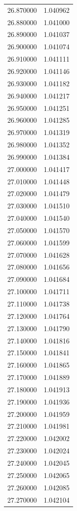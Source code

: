 \begin{tabular}{rr}
26.870000 & 1.040962 \\
26.880000 & 1.041000 \\
26.890000 & 1.041037 \\
26.900000 & 1.041074 \\
26.910000 & 1.041111 \\
26.920000 & 1.041146 \\
26.930000 & 1.041182 \\
26.940000 & 1.041217 \\
26.950000 & 1.041251 \\
26.960000 & 1.041285 \\
26.970000 & 1.041319 \\
26.980000 & 1.041352 \\
26.990000 & 1.041384 \\
27.000000 & 1.041417 \\
27.010000 & 1.041448 \\
27.020000 & 1.041479 \\
27.030000 & 1.041510 \\
27.040000 & 1.041540 \\
27.050000 & 1.041570 \\
27.060000 & 1.041599 \\
27.070000 & 1.041628 \\
27.080000 & 1.041656 \\
27.090000 & 1.041684 \\
27.100000 & 1.041711 \\
27.110000 & 1.041738 \\
27.120000 & 1.041764 \\
27.130000 & 1.041790 \\
27.140000 & 1.041816 \\
27.150000 & 1.041841 \\
27.160000 & 1.041865 \\
27.170000 & 1.041889 \\
27.180000 & 1.041913 \\
27.190000 & 1.041936 \\
27.200000 & 1.041959 \\
27.210000 & 1.041981 \\
27.220000 & 1.042002 \\
27.230000 & 1.042024 \\
27.240000 & 1.042045 \\
27.250000 & 1.042065 \\
27.260000 & 1.042085 \\
27.270000 & 1.042104 \\

\end{tabular}

